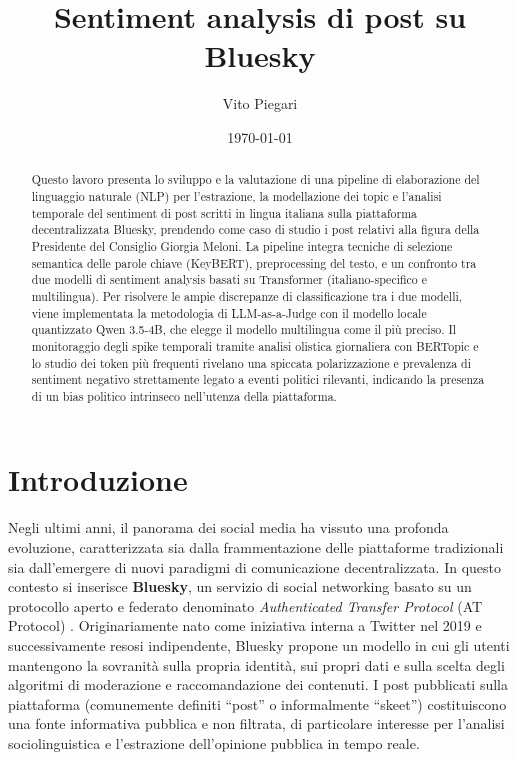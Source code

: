 \documentclass[11pt]{article}
\title{Sentiment analysis di post su Bluesky}
\author{Vito Piegari}
\date{\today}
\begin{document}
\maketitle
\newpage
\begin{abstract}
Questo lavoro presenta lo sviluppo e la valutazione di una pipeline di elaborazione del linguaggio naturale (NLP) per l'estrazione, la modellazione dei topic e l'analisi temporale del sentiment di post scritti in lingua italiana sulla piattaforma decentralizzata Bluesky, prendendo come caso di studio i post relativi alla figura della Presidente del Consiglio Giorgia Meloni. La pipeline integra tecniche di selezione semantica delle parole chiave (KeyBERT), preprocessing del testo, e un confronto tra due modelli di sentiment analysis basati su Transformer (italiano-specifico e multilingua). Per risolvere le ampie discrepanze di classificazione tra i due modelli, viene implementata la metodologia di LLM-as-a-Judge con il modello locale quantizzato Qwen 3.5-4B, che elegge il modello multilingua come il più preciso. Il monitoraggio degli spike temporali tramite analisi olistica giornaliera con BERTopic e lo studio dei token più frequenti rivelano una spiccata polarizzazione e prevalenza di sentiment negativo strettamente legato a eventi politici rilevanti, indicando la presenza di un bias politico intrinseco nell'utenza della piattaforma.
\end{abstract}
\newpage
\tableofcontents
\newpage
\section{Introduzione}
Negli ultimi anni, il panorama dei social media ha vissuto una profonda evoluzione, caratterizzata sia dalla frammentazione delle piattaforme tradizionali sia dall'emergere di nuovi paradigmi di comunicazione decentralizzata. In questo contesto si inserisce \textbf{Bluesky}, un servizio di social networking basato su un protocollo aperto e federato denominato \textit{Authenticated Transfer Protocol} (AT Protocol) \cite{atproto}. Originariamente nato come iniziativa interna a Twitter nel 2019 e successivamente resosi indipendente, Bluesky propone un modello in cui gli utenti mantengono la sovranità sulla propria identità, sui propri dati e sulla scelta degli algoritmi di moderazione e raccomandazione dei contenuti. I post pubblicati sulla piattaforma (comunemente definiti ``post'' o informalmente ``skeet'') costituiscono una fonte informativa pubblica e non filtrata, di particolare interesse per l'analisi sociolinguistica e l'estrazione dell'opinione pubblica in tempo reale.
\end{document}
